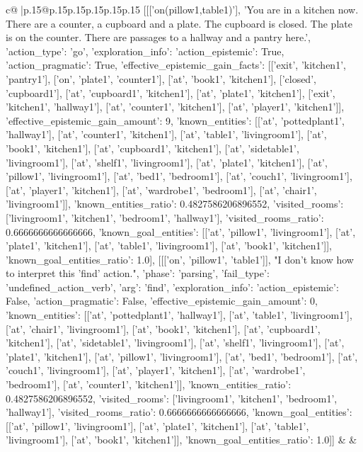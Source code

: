 \documentclass{article}
\begin{document}
{\begin{supertabular}{c@{$\;$}|p{.15\linewidth}@{}p{.15\linewidth}p{.15\linewidth}p{.15\linewidth}p{.15\linewidth}p{.15\linewidth}}
{{{	 [[['on(pillow1,table1)'], 'You are in a kitchen now. There are a counter, a cupboard and a plate. The cupboard is closed. The plate is on the counter. There are passages to a hallway and a pantry here.', {'action_type': 'go', 'exploration_info': {'action_epistemic': True, 'action_pragmatic': True, 'effective_epistemic_gain_facts': [['exit', 'kitchen1', 'pantry1'], ['on', 'plate1', 'counter1'], ['at', 'book1', 'kitchen1'], ['closed', 'cupboard1'], ['at', 'cupboard1', 'kitchen1'], ['at', 'plate1', 'kitchen1'], ['exit', 'kitchen1', 'hallway1'], ['at', 'counter1', 'kitchen1'], ['at', 'player1', 'kitchen1']], 'effective_epistemic_gain_amount': 9, 'known_entities': [['at', 'pottedplant1', 'hallway1'], ['at', 'counter1', 'kitchen1'], ['at', 'table1', 'livingroom1'], ['at', 'book1', 'kitchen1'], ['at', 'cupboard1', 'kitchen1'], ['at', 'sidetable1', 'livingroom1'], ['at', 'shelf1', 'livingroom1'], ['at', 'plate1', 'kitchen1'], ['at', 'pillow1', 'livingroom1'], ['at', 'bed1', 'bedroom1'], ['at', 'couch1', 'livingroom1'], ['at', 'player1', 'kitchen1'], ['at', 'wardrobe1', 'bedroom1'], ['at', 'chair1', 'livingroom1']], 'known_entities_ratio': 0.4827586206896552, 'visited_rooms': ['livingroom1', 'kitchen1', 'bedroom1', 'hallway1'], 'visited_rooms_ratio': 0.6666666666666666, 'known_goal_entities': [['at', 'pillow1', 'livingroom1'], ['at', 'plate1', 'kitchen1'], ['at', 'table1', 'livingroom1'], ['at', 'book1', 'kitchen1']], 'known_goal_entities_ratio': 1.0}}], [[['on', 'pillow1', 'table1']], "I don't know how to interpret this 'find' action.", {'phase': 'parsing', 'fail_type': 'undefined_action_verb', 'arg': 'find', 'exploration_info': {'action_epistemic': False, 'action_pragmatic': False, 'effective_epistemic_gain_amount': 0, 'known_entities': [['at', 'pottedplant1', 'hallway1'], ['at', 'table1', 'livingroom1'], ['at', 'chair1', 'livingroom1'], ['at', 'book1', 'kitchen1'], ['at', 'cupboard1', 'kitchen1'], ['at', 'sidetable1', 'livingroom1'], ['at', 'shelf1', 'livingroom1'], ['at', 'plate1', 'kitchen1'], ['at', 'pillow1', 'livingroom1'], ['at', 'bed1', 'bedroom1'], ['at', 'couch1', 'livingroom1'], ['at', 'player1', 'kitchen1'], ['at', 'wardrobe1', 'bedroom1'], ['at', 'counter1', 'kitchen1']], 'known_entities_ratio': 0.4827586206896552, 'visited_rooms': ['livingroom1', 'kitchen1', 'bedroom1', 'hallway1'], 'visited_rooms_ratio': 0.6666666666666666, 'known_goal_entities': [['at', 'pillow1', 'livingroom1'], ['at', 'plate1', 'kitchen1'], ['at', 'table1', 'livingroom1'], ['at', 'book1', 'kitchen1']], 'known_goal_entities_ratio': 1.0}}]] 
	  } 
	   } 
	   } 
	 & & \\ 
 


\end{supertabular}}
\end{document}
